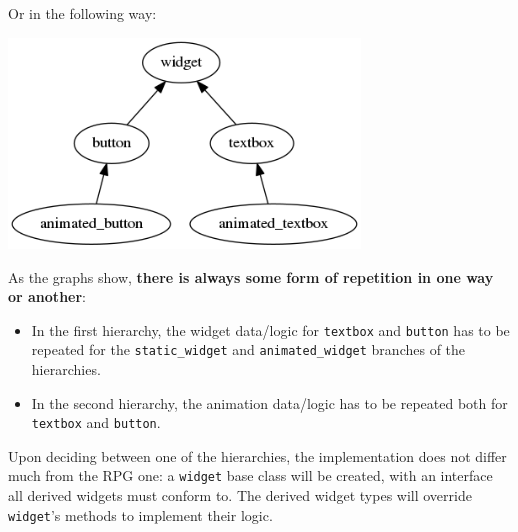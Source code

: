\documentclass[twoside, 12pt, a4paper, openright]{book}
\let\origfigure=\figure
\let\endorigfigure=\endfigure
\renewenvironment{figure}[1][]{%
\origfigure[H]
}{%
\endorigfigure
}
\begin{document}
Or in the following way:

\begin{figure}[htbp]
\centering
\includegraphics[width=0.70000\textwidth]{source/figures/generated/ecs/overview/oop/repetition_problem_2.png}
\caption{OOP encoding issue: repetition \#2}
\end{figure}

As the graphs show, \textbf{there is always some form of repetition in
one way or another}:

\begin{itemize}
\item
  In the first hierarchy, the widget data/logic for
  \texttt{textbox}
  and
  \texttt{button}
  has to be repeated for the
  \texttt{static_widget}
  and
  \texttt{animated_widget}
  branches of the hierarchies.
\item
  In the second hierarchy, the animation data/logic has to be repeated
  both for
  \texttt{textbox}
  and
  \texttt{button}.
\end{itemize}

Upon deciding between one of the hierarchies, the implementation does
not differ much from the RPG one: a
\texttt{widget}
base class will be created, with an interface all derived widgets must
conform to. The derived widget types will override
\texttt{widget}'s
methods to implement their logic.
\end{document}
